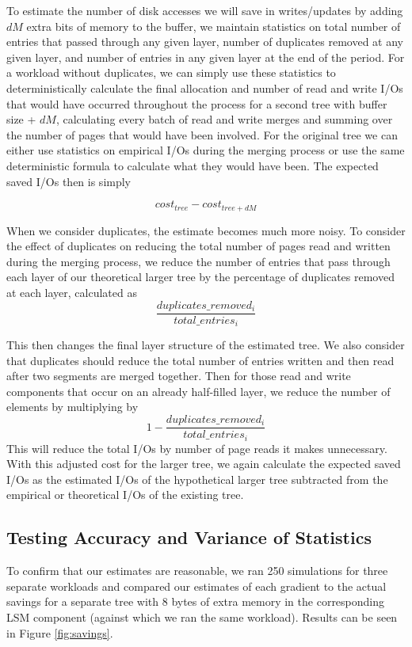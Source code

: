 \documentclass{cidr-2019}
\begin{document}
To estimate the number of disk accesses we will save in writes/updates by adding $dM$ extra bits of memory to the buffer, 
we maintain statistics on total number of entries that passed through any given layer, number of duplicates removed at any given layer, and number of entries in any given layer at the end of the period. For a workload without duplicates, we can simply
use these statistics to deterministically calculate the final allocation and number of read and write I/Os that would have
occurred throughout the process for a second tree with buffer size + $dM$, calculating every batch of read and write merges and summing over the number of pages that would have been involved. For the original tree we can either use statistics on empirical I/Os during the merging process or use the same deterministic formula to calculate what they would have been. The expected saved I/Os then is simply

$$cost_{tree} - cost_{tree+dM}$$

When we consider duplicates, the estimate becomes much more noisy. To consider the effect of duplicates on reducing the total number of pages read and written during the merging process, we reduce the number of entries that pass through each layer of our theoretical larger tree by the percentage of duplicates removed at each layer, calculated as $$\frac{duplicates\_removed_{i}}{total\_entries_{i}}$$

This then changes the final layer structure of the estimated tree. We also consider that duplicates should reduce the total number of entries written and then read after two segments are merged together. Then for those read and write components that occur on an already half-filled layer, we reduce the number of elements by multiplying by $$1 - \frac{duplicates\_removed_{i}}{total\_entries_{i}}$$
This will reduce the total I/Os by number of page reads it makes unnecessary. With this adjusted cost for the larger tree, we again calculate the expected saved I/Os as the estimated I/Os of the hypothetical larger tree subtracted from the empirical or theoretical I/Os of the existing tree.

\subsection{Testing Accuracy and Variance of Statistics}

To confirm that our estimates are reasonable, we ran 250 simulations for three
separate workloads and compared our estimates of each gradient to the actual
savings for a separate tree with 8 bytes of extra memory in the corresponding
LSM component (against which we ran the same workload). Results can be seen in
Figure \ref{fig:savings}.
\end{document}
